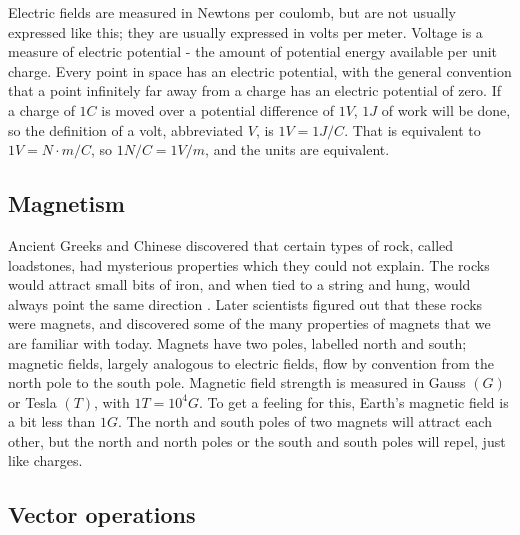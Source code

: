 \documentclass[12pt]{article}
\begin{document}
Electric fields are measured in Newtons per coulomb, but are not usually expressed like this; they are usually expressed in volts per meter. Voltage is a measure of electric potential - the amount of potential energy available per unit charge. Every point in space has an electric potential, with the general convention that a point infinitely far away from a charge has an electric potential of zero. If a charge of $1C$ is moved over a potential difference of $1V$, $1J$ of work will be done, so the definition of a volt, abbreviated $V$, is $1V=1J/C$. That is equivalent to $1V=N\cdot m/C$, so $1N/C=1V/m$, and the units are equivalent. 

\subsection{Magnetism}

\indent Ancient Greeks and Chinese discovered that certain types of rock, called loadstones, had mysterious properties which they could not explain. The rocks would attract small bits of iron, and when tied to a string and hung, would always point the same direction \cite{magnet}. Later scientists figured out that these rocks were magnets, and discovered some of the many properties of magnets that we are familiar with today. Magnets have two poles, labelled north and south; magnetic fields, largely analogous to electric fields, flow by convention from the north pole to the south pole. Magnetic field strength is measured in Gauss $(G)$ or Tesla $(T)$, with $1T=10^4G$. To get a feeling for this, Earth's magnetic field is a bit less than $1G$. The north and south poles of two magnets will attract each other, but the north and north poles or the south and south poles will repel, just like charges.

\subsection{Vector operations}
\end{document}
